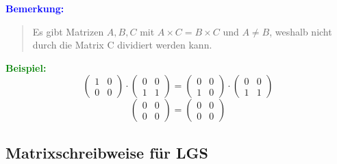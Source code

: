 \documentclass{article}
\newcommand{\blue}[1]{\textcolor{blue}{#1}}
\newcommand{\green}[1]{\textcolor{green}{#1}}
\newcommand{\ex}{\green{\textbf{Beispiel: }}}
\newcommand{\an}[1]{\blue{\textbf{Bemerkung: }}\begin{quote}#1\end{quote}}
\begin{document}
\newpage

\an{Es gibt Matrizen $A, B, C$ mit $A \times C = B \times C$ und $A \neq B$, weshalb nicht durch die Matrix C dividiert werden kann.}

\ex
\begin{equation*}
    \begin{pmatrix}
        1 & 0\\
        0 & 0
    \end{pmatrix}
    \cdot
    \begin{pmatrix}
        0 & 0\\
        1 & 1
    \end{pmatrix}
    =
    \begin{pmatrix}
        0 & 0\\
        1 & 0
    \end{pmatrix}
    \cdot
    \begin{pmatrix}
        0 & 0\\
        1 & 1
    \end{pmatrix}
\end{equation*}
\begin{equation*}
    \begin{pmatrix}
        0 & 0\\
        0 & 0
    \end{pmatrix}
    =
    \begin{pmatrix}
        0 & 0\\
        0 & 0
    \end{pmatrix}
\end{equation*}

\subsection{Matrixschreibweise für LGS}
\end{document}
